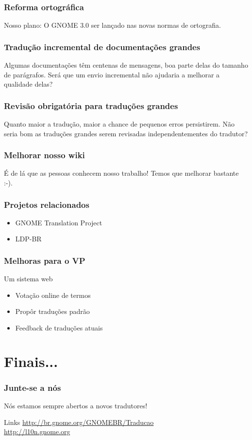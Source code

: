 \documentclass{beamer}
\begin{document}
\begin{frame}
    \frametitle{Reforma ortográfica}

    Nosso plano: O GNOME 3.0 ser lançado nas novas normas de ortografia. 

\end{frame}

\begin{frame}
    \frametitle{Tradução incremental de documentações grandes}
    Algumas documentações têm centenas de mensagens, boa parte delas do tamanho de parágrafos. 
    Será que um envio incremental não ajudaria a melhorar a qualidade delas?
\end{frame}

\begin{frame}
    \frametitle{Revisão obrigatória para traduções grandes}
    Quanto maior a tradução, maior a chance de pequenos erros persistirem. 
    Não seria bom as traduções grandes serem revisadas independentementes do tradutor?
\end{frame}

\begin{frame}
    \frametitle{Melhorar nosso wiki}
    É de lá que as pessoas conhecem nosso trabalho! Temos que melhorar bastante :-).
\end{frame}

\begin{frame}
  \frametitle{Projetos relacionados}
  \begin{itemize}
    \item GNOME Translation Project
    \item LDP-BR
  \end{itemize}
\end{frame}

\begin{frame}
  \frametitle{Melhoras para o VP}
  Um sistema web
  \begin{itemize}[<+->]
    \item Votação online de termos
    \item Propôr traduções padrão
    \item Feedback de traduções atuais 
  \end{itemize}
\end{frame}

\section{Finais...}

\begin{frame}
  \frametitle{Junte-se a nós}
  Nós estamos sempre abertos a novos tradutores!
  \begin{block}{Links}
     \url{http://br.gnome.org/GNOMEBR/Traducao}\\
     \url{http://l10n.gnome.org}
  \end{block}
\end{frame}
\end{document}
